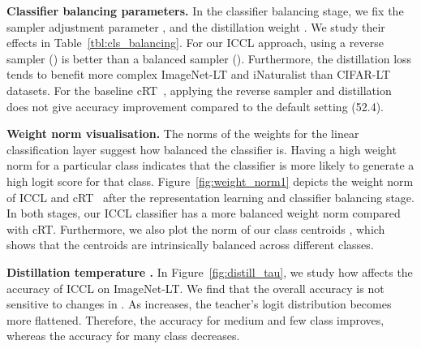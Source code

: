 \textbf{Classifier balancing parameters.} 
In the classifier balancing stage,
we fix the sampler adjustment parameter , 
and the distillation weight .
We study their effects in Table~\ref{tbl:cls_balancing}.
For our ICCL approach, 
using a reverse sampler () is better 
than a balanced sampler ().
Furthermore, the distillation loss tends to benefit more complex ImageNet-LT and iNaturalist than 
CIFAR-LT datasets.
For the baseline cRT~\cite{decouple-longtail},
applying the reverse sampler and distillation does not give accuracy improvement compared to the default setting (52.4).

\begin{table}[!t]
		\setlength\tabcolsep{4pt}
	\centering
\vspace{-1ex}
	\caption
		{\small	
		Ablation study for classifier balancing methods.
		ICCL benefits from using a reverse sampler () 
		and knowledge distillation (), especially for 
		the more complex ImageNet-LT and iNaturalist datasets.
		}
	\label{tbl:cls_balancing}
\vspace{-2.5ex}
\end{table}		


 
\textbf{Weight norm visualisation.}
The  norms of the weights for the linear classification layer suggest how balanced the classifier is.
Having a high weight norm for a particular class indicates that the classifier is more likely to generate a high logit score for that class.
Figure~\ref{fig:weight_norm1} depicts the weight norm of ICCL and cRT~\cite{decouple-longtail} after the representation learning and classifier balancing stage. 
In both stages, our ICCL classifier has a more balanced weight norm compared with cRT. 
Furthermore, we also plot the norm of our class centroids ,
which shows that the centroids are intrinsically balanced across different classes.



\textbf{Distillation temperature .}
In Figure~\ref{fig:distill_tau}, we study how  affects the accuracy of ICCL on ImageNet-LT. 
We find that the overall accuracy is not sensitive to changes in .
As  increases, the teacher's logit distribution becomes more flattened.
Therefore, the accuracy for medium and few class improves,
whereas the accuracy for many class decreases. 







